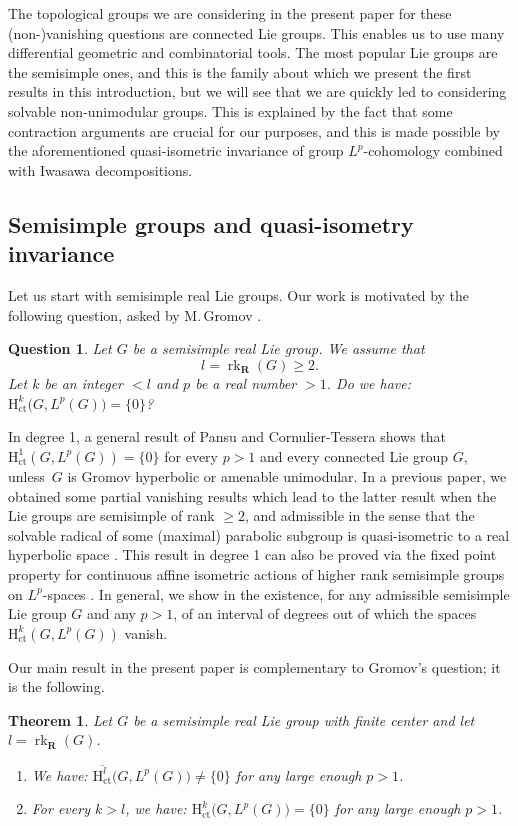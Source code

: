 \documentclass[JEP,XML,SOM,Unicode,published]{cedram}
\newenvironment{enumeratei}
{\bgroup\def\theenumi{\roman{enumi}}\def\theenumii{\arabic{enumii}}\begin{enumerate}}
{\end{enumerate}\egroup}
\newcommand{\ct}{\mathrm{ct}}
\newcommand{\rH}{\mathrm{H}}
\newcommand{\RR}{\mathbf{R}}
\theoremstyle{plain}
\newtheorem{question}[equation]{Question}
\newtheorem{maintheorem}{Theorem}
\theoremstyle{remark}
\theoremstyle{definition}
\DeclareMathOperator{\rk}{rk}
\begin{document}
The topological groups we are considering in the present paper for these (non-)vanishing questions are connected Lie groups.
This enables us to use many differential geometric and combinatorial tools.
The most popular Lie groups are the semisimple ones, and this is the family about which we present the first results in this introduction, but we will see that we are quickly led to considering solvable non-unimodular groups.
This is explained by the fact that some contraction arguments are crucial for our purposes, and this is made possible by the aforementioned quasi-isometric invariance of group $L^p$\nobreakdash-cohomology combined with Iwasawa decompositions.

\subsection{Semisimple groups and quasi-isometry invariance}
\label{ss - ss and QI}
Let us start with semi\-simple real Lie groups.
Our work is motivated by the following question, asked by M.\,Gromov \cite[p.\,253]{G}.

\begin{question}
Let $G$ be a semisimple real Lie group.
We assume that
\[
l=\rk_\RR (G) \geqslant 2.
\]
Let $k$ be an integer $<l$ and $p$ be a real number $>1$.
Do we have: $\rH^k_\ct \bigl(G, L^p(G) \bigr) = \{0\}$?
\end{question}

In degree 1, a general result of Pansu \cite{P2} and Cornulier-Tessera \cite{CT} shows that $\rH^1_\ct (G, L^p(G)) = \{0\}$ for every $p>1$ and
every connected Lie group $G$, unless~$G$ is Gromov hyperbolic or amenable unimodular.
In a previous paper, we obtained some partial vanishing results which lead to the latter result when the Lie groups are semisimple of rank $\geqslant 2$, and admissible in the sense that the solvable radical of some (maximal) parabolic subgroup is quasi-isometric to a real hyperbolic space \cite[Cor.\,1.6]{BR}.
This result in degree 1 can also be proved via the fixed point property for continuous affine isometric actions of higher rank semisimple groups on $L^p$\nobreakdash-spaces \cite{BFGM}.
In general, we show in \cite{BR} the existence, for any admissible semisimple Lie group $G$ and any $p >1$, of an interval of degrees out of which the spaces $\rH^k_\ct (G, L^p(G))$ vanish.

Our main result in the present paper is complementary to Gromov's question; it is the following.

\begin{maintheorem}
\label{introduction-theorem1}
Let $G$ be a semisimple real Lie group with finite center and let $l=\rk_\RR (G)$.
\begin{enumeratei}
\item
We have: $\overline{\rH^l_\ct} \bigl(G, L^p(G) \bigr) \neq \{0\}$ for any large enough $p>1$.
\item
For every $k >l$, we have: $\rH^k_\ct \bigl(G, L^p(G) \bigr) = \{0\}$ for any large enough $p>1$.
\end{enumeratei}
\end{maintheorem}
\end{document}
